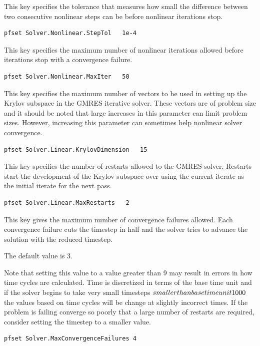 {This key specifies the tolerance that measures how small the
difference between two consecutive nonlinear steps can be before
nonlinear iterations stop.
}
\begin{display}\begin{verbatim}
pfset Solver.Nonlinear.StepTol   1e-4
\end{verbatim}\end{display}

{This key specifies the maximum number of nonlinear iterations allowed before
iterations stop with a convergence failure.
}
\begin{display}\begin{verbatim}
pfset Solver.Nonlinear.MaxIter   50
\end{verbatim}\end{display}


{This key specifies the maximum number of vectors to be used in setting up the
Krylov subspace in the GMRES iterative solver.  These vectors are of problem
size and it should be noted that large increases in this parameter can limit
problem sizes.  However, increasing this parameter can sometimes help nonlinear
solver convergence.
}
\begin{display}\begin{verbatim}
pfset Solver.Linear.KrylovDimension   15
\end{verbatim}\end{display}

{This key specifies the number of restarts allowed to the GMRES solver.
Restarts start the development of the Krylov subspace over using the current
iterate as the initial iterate for the next pass.
}
\begin{display}\begin{verbatim}
pfset Solver.Linear.MaxRestarts   2
\end{verbatim}\end{display}

{This key gives the maximum number of convergence failures
allowed.   Each convergence failure cuts the timestep
in half and the solver tries to advance the solution with the reduced
timestep.

The default value is 3.

Note that setting this value to a value greater than 9 may result in
errors in how time cycles are calculated.  Time is discretized in
terms of the base time unit and if the solver begins to take very
small timesteps \(smaller than base time unit \/ 1000\) the values based
on time cycles will be change at slightly incorrect times. If the
problem is failing converge so poorly that a large number of restarts are
required, consider setting the timestep to a smaller value.
}
\begin{display}\begin{verbatim}
pfset Solver.MaxConvergenceFailures 4
\end{verbatim}\end{display}

